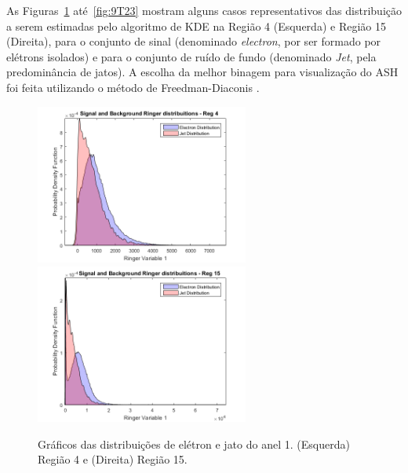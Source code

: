 As Figuras~\ref{fig:9T20} até~\ref{fig:9T23} mostram alguns casos representativos das distribuição a serem estimadas pelo algoritmo de KDE na Região 4 (Esquerda) e Região 15 (Direita), para o conjunto de sinal (denominado \emph{electron}, por ser formado por elétrons isolados) e para o conjunto de ruído de fundo (denominado \emph{Jet}, pela predominância de jatos). A escolha da melhor binagem para visualização do \ac{ASH} foi feita utilizando o método de Freedman-Diaconis \cite{freedman1981histogram}.

\begin{figure}[H]
	\centering
	\includegraphics[width=7cm]{./textuais/algoritmo/figuras/DISTKERNELET3ETA0VAR1KF1.png}
    \includegraphics[width=7cm]{./textuais/algoritmo/figuras/DISTKERNELET4ETA2VAR1KF1.png}\\
	\caption{Gráficos das distribuições de elétron e jato do anel 1. (Esquerda) Região 4 e (Direita) Região 15.}
	\label{fig:9T20}
\end{figure}


